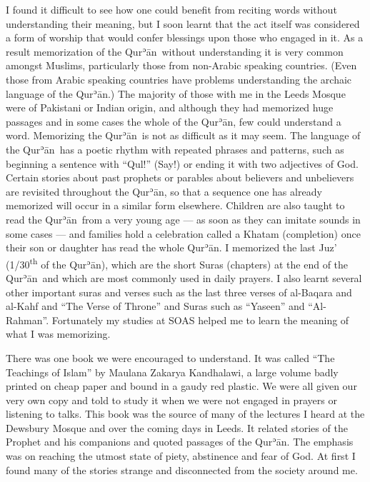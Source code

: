 \documentclass[12pt]{memoir}
\def\´{ʾ} %
\let \Sup=\textsuperscript
\newcommand{\cor}[2]{#2} %
\def \Quran{Qur\-\´ān} %
\begin{document}
I found it difficult to see how one could benefit from reciting words
without understanding their meaning,
but I soon learnt that the act itself was considered a form of worship
that would confer blessings upon those who engaged in it.
As a result memorization of the \Quran\ without understanding it
is very common amongst Muslims,
particularly those from non-Arabic speaking countries.
(Even those from Arabic speaking countries
have problems understanding the archaic language of the \Quran.)
The majority of those with me in the Leeds Mosque
were of Pakistani or Indian origin,
and although they had memorized huge passages
and in some cases the whole of the \Quran, few could understand a word.
Memorizing the \Quran\ is not as difficult as it may seem.
The language of the \Quran\ has a poetic rhythm
with repeated phrases and patterns,
such as beginning a sentence with “Qul!” (Say!)
or ending it with two adjectives of God.
Certain stories about past prophets or parables about believers
and unbelievers are \cor{re-visited}{revisited} throughout the \Quran,
so that a sequence one has already memorized
will occur in a similar form elsewhere.
Children are also taught to read the \Quran\ from a very young age —
as soon as they can imitate sounds in some cases —
and families hold a celebration called a Khatam (completion)
once their son or daughter has read the whole \Quran.
I memorized the last Juz’ (1/30\Sup{th} of the \Quran),
which are the short Suras (chapters) at the end of the \Quran\
and which are most commonly used in daily prayers.
I also learnt several other important suras and verses
such as the last three verses of al-Baqara and al-Kahf and
“The Verse of Throne” and Suras such as “Yaseen” and “Al-Rahman”.
Fortunately my studies at SOAS helped me
to learn the meaning of what I was memorizing.

There was one book we were encouraged to understand.
It was called “The Teachings of Islam”
by Maulana Zakarya \cor{Kandhlwi}{Kandhalawi},
a large volume badly printed on cheap paper and bound in a gaudy red plastic.
We were all given our very own copy and told to study it
when we were not engaged in prayers or listening to talks.
This book was the source of many of the lectures
I heard at the Dewsbury Mosque and over the coming days in Leeds.
It related stories of the Prophet and his companions
and quoted passages of the \Quran.
The emphasis was on reaching the utmost state of piety,
abstinence and fear of God.
At first I found many of the stories strange
and disconnected from the society around me.
\end{document}
